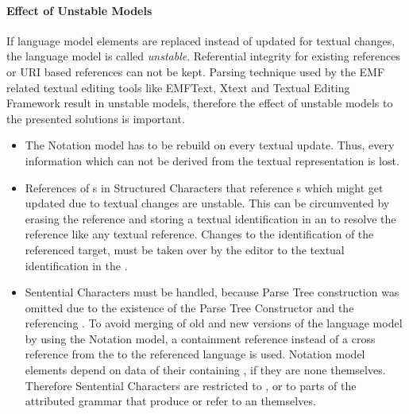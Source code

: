 \paragraph{Effect of Unstable Models}
If language model elements are replaced instead of updated for textual changes, the language model is called \emph{unstable}. Referential integrity for existing references or URI based references can not be kept. Parsing technique used by the EMF related textual editing tools like EMFText, Xtext and Textual Editing Framework result in unstable models, therefore the effect of unstable models to the presented solutions is important. 
\begin{itemize}
	\item The Notation model has to be rebuild on every textual update. Thus, every information which can not be derived from the textual representation is lost.
	\item References of s in Structured Characters that reference s which might get updated due to textual changes are unstable. This can be circumvented by erasing the reference and storing a textual identification in an  to resolve the reference like any textual reference. Changes to the identification of the referenced target, must be taken over by the editor to the textual identification in the .
	\item Sentential Characters must be handled, because Parse Tree construction was omitted due to the existence of the Parse Tree Constructor and the referencing . To avoid merging of old and new versions of the language model by using the Notation model, a containment reference instead of a cross reference from the  to the referenced language  is used. Notation model elements depend on data of their containing , if they are none themselves. Therefore Sentential Characters are restricted to , or to parts of the attributed grammar that produce or refer to an  themselves. 
\end{itemize}


